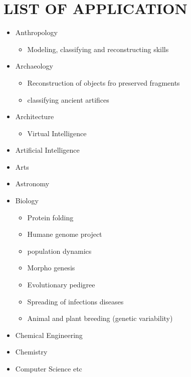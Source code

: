 \documentclass[12pt]{report}
\begin{document}
	\section{LIST OF APPLICATION}
	\begin{itemize}
		\item Anthropology
			\begin{itemize}
				\item Modeling, classifying and reconstructing skills
			\end{itemize}
		
		\item Archaeology 
			\begin{itemize}
				\item Reconstruction  of objects fro preserved fragments
				\item classifying ancient artifices
			\end{itemize}
		
		\item Architecture
			\begin{itemize}
				\item Virtual Intelligence
			\end{itemize}
		\item Artificial Intelligence
		\item Arts
		\item Astronomy
		\item Biology
			\begin{itemize}
				\item Protein folding
				\item Humane genome project
				\item population dynamics
				\item Morpho genesis
				\item Evolutionary pedigree
				\item Spreading of infections diseases
				\item Animal and plant breeding (genetic variability)
			\end{itemize}
		
		\item Chemical Engineering
		\item Chemistry
		\item Computer Science etc
	\end{itemize}
\end{document}
